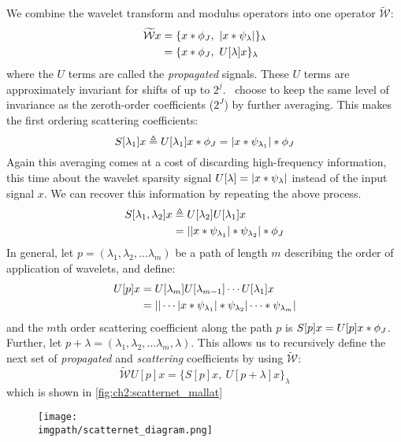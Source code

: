 We combine the wavelet transform and modulus operators into one operator
$\widetilde{\mathcal{W}}$:
\begin{align}
  \widetilde{\mathcal{W}}x &= \{ x \ast \phi_J,\ |x \ast \psi_\lambda| \}_\lambda \label{eq:ch2:wave3}\\
             &= \{ x \ast \phi_J,\ U[\lambda]x \}_\lambda
\end{align}
where the $U$ terms are called the \emph{propagated} signals.
These $U$ terms are approximately invariant for shifts of up to $2^j$. \Mallat\ choose to
keep the same level of invariance as the zeroth-order coefficients ($2^J$)
by further averaging. This makes the first ordering scattering coefficients:
\begin{equation}
  S[\lambda_1]x \triangleq U[\lambda_1]x \ast \phi_J
  = |x \ast \psi_{\lambda_1}| \ast \phi_J
\end{equation}
Again this averaging comes at a cost of discarding high-frequency information,
this time about the wavelet sparsity signal $U[\lambda] = |x \ast
\psi_\lambda|$ instead of the input signal $x$. We can recover this information
by repeating the above process.
\begin{align}
  S[\lambda_1, \lambda_2]x &\triangleq U[\lambda_2]U[\lambda_1]x \\
                           &=||x \ast \psi_{\lambda_1}| \ast \psi_{\lambda_2}| \ast \phi_J
\end{align}
In general, let $p=(\lambda_1, \lambda_2, \ldots \lambda_m)$ be a path of length
$m$ describing the order of application of wavelets, and define:
\begin{align}
  U[p]x &= U[\lambda_m]U[\lambda_{m-1}]\cdots U[\lambda_1]x \\
        &= || \cdots |x \ast \psi_{\lambda_1}| \ast \psi_{\lambda_2} | \cdots
  \ast \psi_{\lambda_m}|
\end{align}
and the $m$th order scattering coefficient along the path $p$ is $S[p]x = U[p]x
\ast \phi_J$. Further, let $p+\lambda = (\lambda_1, \lambda_2, \ldots
\lambda_m, \lambda)$.  This allows us to recursively define the next set of
\emph{propagated} and \emph{scattering} coefficients by using $\widetilde{\mathcal{W}}$:
\begin{equation}
  \widetilde{\mathcal{W}}U[p]x = \{ S[p]x,\ U[p+\lambda]x \}_\lambda \label{eq:ch2:recursive}
\end{equation}
which is shown in \autoref{fig:ch2:scatternet_mallat}
  \begin{figure}
    \centering
      \texttt{[image: \\imgpath/scatternet\_diagram.png]}
      \label{fig:ch2:scatternet_mallat}
  \end{figure}

